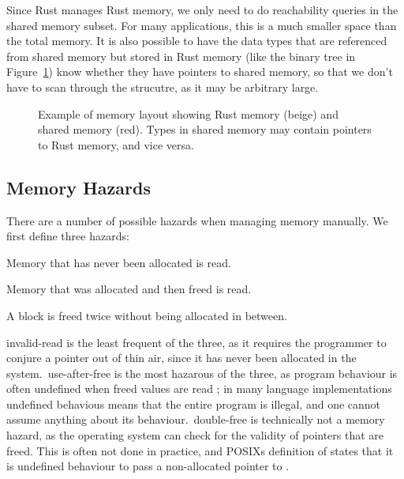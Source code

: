 Since Rust manages Rust memory, we only need to do reachability queries in the shared memory
subset. For many applications, this is a much smaller space than the total memory. It is also
possible to have the data types that are referenced from shared memory but stored in Rust memory
(like the binary tree in Figure~\ref{fig:rust-shared-mem}) know whether they have pointers to
shared memory, so that we don't have to scan through the strucutre, as it may be arbitrary large.


\begin{figure}
  \centering
  
  \caption{Example of memory layout showing Rust memory (beige) and shared memory (red). Types in
  shared memory may contain pointers to Rust memory, and vice versa.\label{fig:rust-shared-mem}}
\end{figure}

\subsection{Memory Hazards}

There are a number of possible hazards when managing memory manually. We first define three
hazards:

\begin{definition}
  Memory that has never been allocated is read.
\end{definition}

\begin{definition}
  Memory that was allocated and then freed is read.
\end{definition}

\begin{definition}
  A block is freed twice without being allocated in between.
\end{definition}

invalid-read is the least frequent of the three, as it requires the programmer to conjure a pointer
out of thin air, since it has never been allocated in the system.\ use-after-free is the most
hazarous of the three, as program behaviour is often undefined when freed values are read ; in many language implementations undefined behavious means that the entire program is illegal,
and one cannot assume anything about its behaviour.\ double-free is technically not a memory
hazard, as the operating system can check for the validity of pointers that are freed. This is
often not done in practice, and POSIXs definition of  states that it is undefined
behaviour to pass a non-allocated pointer to .  

